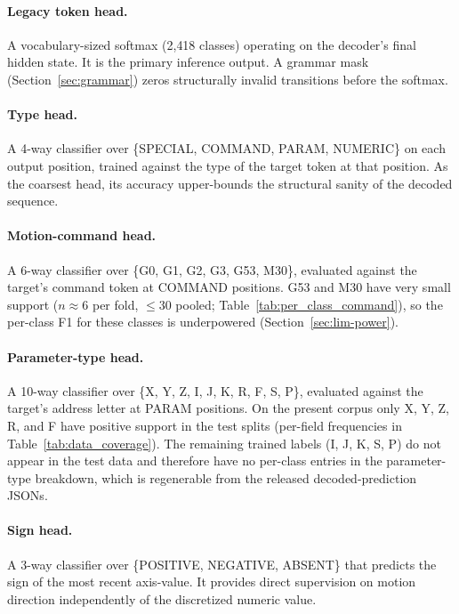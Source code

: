 \documentclass[sensors,article,submit,moreauthors,pdftex]{Definitions/mdpi}
\begin{document}
\paragraph{Legacy token head.} A vocabulary-sized softmax (2{,}418 classes) operating on the decoder's final hidden state. It is the primary inference output. A grammar mask (Section~\ref{sec:grammar}) zeros structurally invalid transitions before the softmax.

\paragraph{Type head.} A 4-way classifier over \{SPECIAL, COMMAND, PARAM, NUMERIC\} on each output position, trained against the type of the target token at that position. As the coarsest head, its accuracy upper-bounds the structural sanity of the decoded sequence.

\paragraph{Motion-command head.} A 6-way classifier over \{G0, G1, G2, G3, G53, M30\}, evaluated against the target's command token at COMMAND positions. G53 and M30 have very small support ($n\!\approx\!6$ per fold, $\le\!30$ pooled; Table~\ref{tab:per_class_command}), so the per-class F1 for these classes is underpowered (Section~\ref{sec:lim-power}).

\paragraph{Parameter-type head.} A 10-way classifier over \{X, Y, Z, I, J, K, R, F, S, P\}, evaluated against the target's address letter at PARAM positions. On the present corpus only X, Y, Z, R, and F have positive support in the test splits (per-field frequencies in Table~\ref{tab:data_coverage}). The remaining trained labels (I, J, K, S, P) do not appear in the test data and therefore have no per-class entries in the parameter-type breakdown, which is regenerable from the released decoded-prediction JSONs.

\paragraph{Sign head.} A 3-way classifier over \{POSITIVE, NEGATIVE, ABSENT\} that predicts the sign of the most recent axis-value. It provides direct supervision on motion direction independently of the discretized numeric value.
\end{document}
